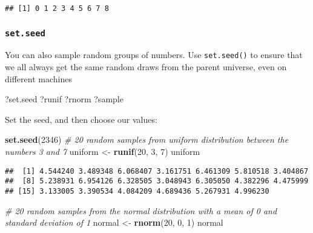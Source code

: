 \documentclass[]{article}
\newenvironment{Shaded}{\begin{snugshade}}{\end{snugshade}}
\newcommand{\KeywordTok}[1]{\textcolor[rgb]{0.13,0.29,0.53}{\textbf{#1}}}
\newcommand{\DecValTok}[1]{\textcolor[rgb]{0.00,0.00,0.81}{#1}}
\newcommand{\StringTok}[1]{\textcolor[rgb]{0.31,0.60,0.02}{#1}}
\newcommand{\CommentTok}[1]{\textcolor[rgb]{0.56,0.35,0.01}{\textit{#1}}}
\newcommand{\NormalTok}[1]{#1}
\begin{document}
\begin{verbatim}
## [1] 0 1 2 3 4 5 6 7 8
\end{verbatim}

\subsubsection{\texorpdfstring{\texttt{set.seed}}{set.seed}}\label{set.seed}

You can also sample random groups of numbers. Use \texttt{set.seed()} to
ensure that we all always get the same random draws from the parent
universe, even on different machines

\begin{Shaded}
\begin{Highlighting}[]
\NormalTok{?set.seed}
\NormalTok{?runif}
\NormalTok{?rnorm}
\NormalTok{?sample}
\end{Highlighting}
\end{Shaded}

Set the seed, and then choose our values:

\begin{Shaded}
\begin{Highlighting}[]
\KeywordTok{set.seed}\NormalTok{(}\DecValTok{2346}\NormalTok{)}
\CommentTok{# 20 random samples from uniform distribution between the numbers 3 and 7}
\NormalTok{uniform <-}\StringTok{ }\KeywordTok{runif}\NormalTok{(}\DecValTok{20}\NormalTok{, }\DecValTok{3}\NormalTok{, }\DecValTok{7}\NormalTok{) }
\NormalTok{uniform}
\end{Highlighting}
\end{Shaded}

\begin{verbatim}
##  [1] 4.544240 3.489348 6.068407 3.161751 6.461309 5.810518 3.404867
##  [8] 5.238931 6.954126 6.328505 3.048943 6.305050 4.382296 4.475999
## [15] 3.133005 3.390534 4.084209 4.689436 5.267931 4.996230
\end{verbatim}

\begin{Shaded}
\begin{Highlighting}[]
\CommentTok{# 20 random samples from the normal distribution with a mean of 0 and standard deviation of 1}
\NormalTok{normal <-}\StringTok{ }\KeywordTok{rnorm}\NormalTok{(}\DecValTok{20}\NormalTok{, }\DecValTok{0}\NormalTok{, }\DecValTok{1}\NormalTok{) }
\NormalTok{normal}
\end{Highlighting}
\end{Shaded}
\end{document}
